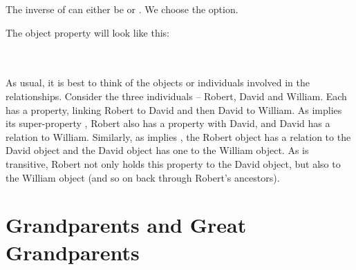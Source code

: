The inverse of  can either be  or . We choose the  option.


The  object property will look like this:

\\\\
As usual, it is best to think of the objects or individuals involved in the relationships. Consider the three individuals -- Robert, David and William. Each has a  property, linking Robert to David and then David to William. As  implies its super-property , Robert also has a  property with David, and David has a  relation to William. Similarly, as  implies , the Robert object has a  relation to the David object and the David object has one to the William object. As  is transitive, Robert not only holds this property to the David object, but also to the William object (and so on back through Robert's ancestors).

\section{Grandparents and Great Grandparents}

